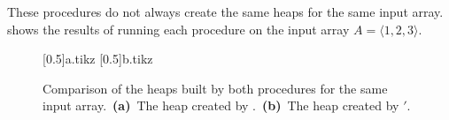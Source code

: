 These procedures do not always create the same heaps for the same input array.
 shows the results of running each procedure on the input array $A=\langle1,2,3\rangle$.
\begin{figure}[htb]
    \captionsetup[subfigure]{}
    \subcaptionbox{\label{fig:6-1a}}[0.5\textwidth]{{a.tikz}}
    \subcaptionbox{\label{fig:6-1b}}[0.5\textwidth]{{b.tikz}}
    \caption{Comparison of the heaps built by both procedures for the same input array.\,
    \textbf{(a)}\, The heap created by .\,
    \textbf{(b)}\, The heap created by $'$.} \label{fig:6-1}
\end{figure}
